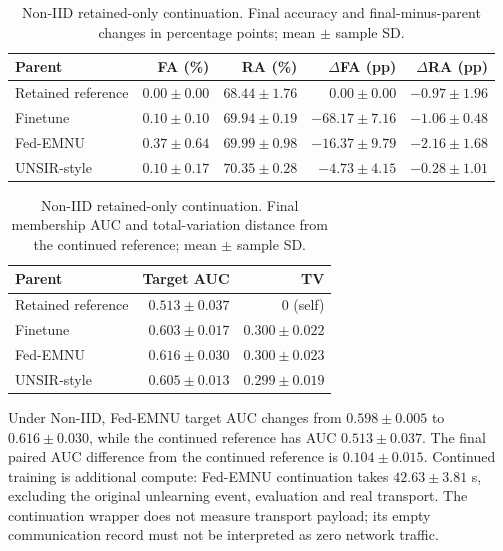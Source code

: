 \documentclass[software,article,submit,moreauthors]{Definitions/mdpi}
\begin{document}
\begin{table}[H]\centering\footnotesize\setlength{\tabcolsep}{4pt}
\caption{Non-IID retained-only continuation. Final accuracy and final-minus-parent changes in percentage points; mean $\pm$ sample SD.}
\label{tab:continuation-noniid}
\begin{tabular}{lrrrr}\toprule Parent & FA (\%) & RA (\%) & $\Delta$FA (pp) & $\Delta$RA (pp)\\\midrule
Retained reference & $0.00 \pm 0.00$ & $68.44 \pm 1.76$ & $0.00 \pm 0.00$ & $-0.97 \pm 1.96$\\
Finetune & $0.10 \pm 0.10$ & $69.94 \pm 0.19$ & $-68.17 \pm 7.16$ & $-1.06 \pm 0.48$\\
Fed-EMNU & $0.37 \pm 0.64$ & $69.99 \pm 0.98$ & $-16.37 \pm 9.79$ & $-2.16 \pm 1.68$\\
UNSIR-style & $0.10 \pm 0.17$ & $70.35 \pm 0.28$ & $-4.73 \pm 4.15$ & $-0.28 \pm 1.01$\\
\bottomrule\end{tabular}\end{table}
\begin{table}[H]\centering\footnotesize\setlength{\tabcolsep}{4pt}
\caption{Non-IID retained-only continuation. Final membership AUC and total-variation distance from the continued reference; mean $\pm$ sample SD.}
\label{tab:continuation-noniid-compute}
\begin{tabular}{lrr}\toprule Parent & Target AUC & TV\\\midrule
Retained reference & $0.513 \pm 0.037$ & 0 (self)\\
Finetune & $0.603 \pm 0.017$ & $0.300 \pm 0.022$\\
Fed-EMNU & $0.616 \pm 0.030$ & $0.300 \pm 0.023$\\
UNSIR-style & $0.605 \pm 0.013$ & $0.299 \pm 0.019$\\
\bottomrule\end{tabular}\end{table}

Under Non-IID, Fed-EMNU target AUC changes from $0.598 \pm 0.005$ to $0.616 \pm 0.030$, while the continued reference has AUC $0.513 \pm 0.037$. The final paired AUC difference from the continued reference is $0.104 \pm 0.015$. Continued training is additional compute: Fed-EMNU continuation takes $42.63 \pm 3.81$ s, excluding the original unlearning event, evaluation and real transport. The continuation wrapper does not measure transport payload; its empty communication record must not be interpreted as zero network traffic.
\end{document}
